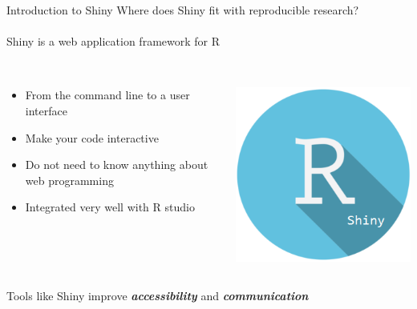 \documentclass[serif]{beamer}\usepackage[]{graphicx}\usepackage[]{color}
\newcommand{\emtxt}[1]{\textbf{\textit{#1}}}
\begin{document}
\begin{frame}{Introduction to Shiny}
Where does Shiny fit with reproducible research? \\~\\
Shiny is a web application framework for R \\~\\
\begin{columns}
\begin{column}{0.7\textwidth}
\begin{itemize}
\item From the command line to a user interface 
\item Make your code interactive 
\item Do not need to know anything about web programming
\item Integrated very well with R studio \\~\\
\end{itemize}
\end{column}
\begin{column}{0.2\textwidth}
\centerline{\includegraphics[width = \textwidth]{fig/shiny_logo.png}}
\end{column}
\end{columns}
\vspace{0.16in}
Tools like Shiny improve \emtxt{accessibility} and \emtxt{communication} 
\end{frame}
\end{document}
